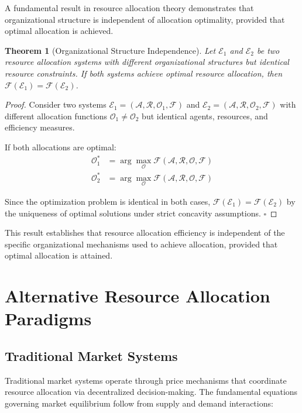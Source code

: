 \documentclass[12pt,a4paper]{article}
\newtheorem{theorem}{Theorem}
\begin{document}
A fundamental result in resource allocation theory demonstrates that organizational structure is independent of allocation optimality, provided that optimal allocation is achieved.

\begin{theorem}[Organizational Structure Independence]
Let $\mathcal{E}_1$ and $\mathcal{E}_2$ be two resource allocation systems with different organizational structures but identical resource constraints. If both systems achieve optimal resource allocation, then $\mathcal{F}(\mathcal{E}_1) = \mathcal{F}(\mathcal{E}_2)$.
\end{theorem}

\begin{proof}
Consider two systems $\mathcal{E}_1 = (\mathcal{A}, \mathcal{R}, \mathcal{O}_1, \mathcal{F})$ and $\mathcal{E}_2 = (\mathcal{A}, \mathcal{R}, \mathcal{O}_2, \mathcal{F})$ with different allocation functions $\mathcal{O}_1 \neq \mathcal{O}_2$ but identical agents, resources, and efficiency measures.

If both allocations are optimal:
\begin{align}
\mathcal{O}^*_1 &= \arg\max_{\mathcal{O}} \mathcal{F}(\mathcal{A}, \mathcal{R}, \mathcal{O}, \mathcal{F}) \\
\mathcal{O}^*_2 &= \arg\max_{\mathcal{O}} \mathcal{F}(\mathcal{A}, \mathcal{R}, \mathcal{O}, \mathcal{F})
\end{align}

Since the optimization problem is identical in both cases, $\mathcal{F}(\mathcal{E}_1) = \mathcal{F}(\mathcal{E}_2)$ by the uniqueness of optimal solutions under strict concavity assumptions. $\square$
\end{proof}

This result establishes that resource allocation efficiency is independent of the specific organizational mechanisms used to achieve allocation, provided that optimal allocation is attained.

\section{Alternative Resource Allocation Paradigms}

\subsection{Traditional Market Systems}

Traditional market systems operate through price mechanisms that coordinate resource allocation via decentralized decision-making. The fundamental equations governing market equilibrium follow from supply and demand interactions:
\end{document}
